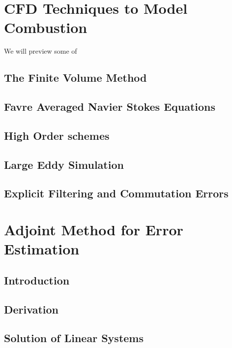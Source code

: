 \documentclass[titlepage,11pt,letterpaper]{article}
\begin{document}
\section{CFD Techniques to Model Combustion}

\noindent We will preview some of\\
\subsection{The Finite Volume Method}
\subsection{Favre Averaged Navier Stokes Equations}
\subsection{High Order schemes}
\subsection{Large Eddy Simulation}
\subsection{Explicit Filtering and Commutation Errors}


\newpage
\section{Adjoint Method for Error Estimation}
\subsection{Introduction}
\subsection{Derivation}
\subsection{Solution of Linear Systems}
\end{document}
